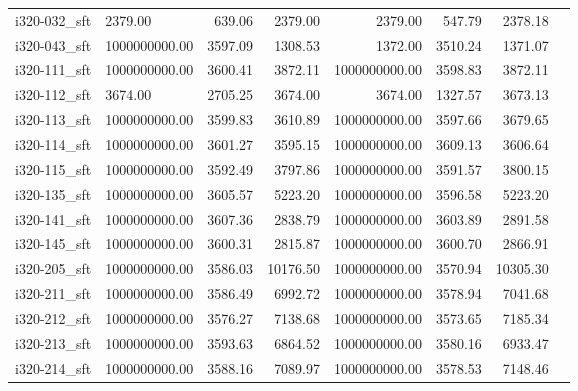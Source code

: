 \begin{tabular}{llrrrrrr}
i320-032\_sft &            2379.00 &                 639.06 &          2379.00 &          2379.00 &               547.79 &        2378.18 \\
i320-043\_sft &      1000000000.00 &                3597.09 &          1308.53 &          1372.00 &              3510.24 &        1371.07 \\
i320-111\_sft &      1000000000.00 &                3600.41 &          3872.11 &    1000000000.00 &              3598.83 &        3872.11 \\
i320-112\_sft &            3674.00 &                2705.25 &          3674.00 &          3674.00 &              1327.57 &        3673.13 \\
i320-113\_sft &      1000000000.00 &                3599.83 &          3610.89 &    1000000000.00 &              3597.66 &        3679.65 \\
i320-114\_sft &      1000000000.00 &                3601.27 &          3595.15 &    1000000000.00 &              3609.13 &        3606.64 \\
i320-115\_sft &      1000000000.00 &                3592.49 &          3797.86 &    1000000000.00 &              3591.57 &        3800.15 \\
i320-135\_sft &      1000000000.00 &                3605.57 &          5223.20 &    1000000000.00 &              3596.58 &        5223.20 \\
i320-141\_sft &      1000000000.00 &                3607.36 &          2838.79 &    1000000000.00 &              3603.89 &        2891.58 \\
i320-145\_sft &      1000000000.00 &                3600.31 &          2815.87 &    1000000000.00 &              3600.70 &        2866.91 \\
i320-205\_sft &      1000000000.00 &                3586.03 &         10176.50 &    1000000000.00 &              3570.94 &       10305.30 \\
i320-211\_sft &      1000000000.00 &                3586.49 &          6992.72 &    1000000000.00 &              3578.94 &        7041.68 \\
i320-212\_sft &      1000000000.00 &                3576.27 &          7138.68 &    1000000000.00 &              3573.65 &        7185.34 \\
i320-213\_sft &      1000000000.00 &                3593.63 &          6864.52 &    1000000000.00 &              3580.16 &        6933.47 \\
i320-214\_sft &      1000000000.00 &                3588.16 &          7089.97 &    1000000000.00 &              3578.53 &        7148.46 \\

\end{tabular}
